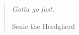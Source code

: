 \vspace*{\fill}
\thispagestyle{empty}
\begin{quotation}
    \em
    Gotta go fast.

    \medskip
\raggedleft{}
    Senic the Herdgherd
\end{quotation}
\vspace*{\fill}
